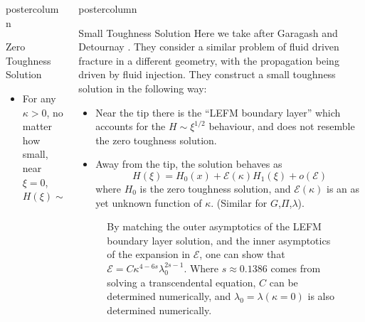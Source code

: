 \documentclass{beamer}
\newcommand{\cE}{\mathcal{E}}                               %
\newlength{\columnheight}
\begin{document}
\begin{frame}
\begin{columns}
\begin{column}{.43\textwidth}
\begin{beamercolorbox}[center]{postercolumn}
\begin{minipage}{.98\textwidth}
{\begin{myblock}{Zero Toughness Solution}
\begin{itemize}
\item For any $\kappa > 0$, no matter how small, near 
      $\xi=0$, $H(\xi)\sim \xi^{1/2}$
\end{itemize}
\end{myblock}\vfill
}\end{minipage}\end{beamercolorbox}
\end{column}
\begin{column}{.57\textwidth}
\begin{beamercolorbox}[center]{postercolumn}
\begin{minipage}{.98\textwidth} %
\parbox[t][\columnheight]{\textwidth}{ %
\begin{myblock}{Small Toughness Solution}
Here we take after Garagash and Detournay \cite{GandD}. They consider
a similar problem of fluid driven fracture in a different geometry, with the
propagation being driven by fluid injection. They construct a small toughness
solution in the following way:
\begin{itemize}
\item Near the tip there is the ``LEFM boundary layer'' which accounts for the
      $H \sim \xi^{1/2}$ behaviour, and does not resemble the zero toughness 
     solution.
\item Away from the tip, the solution behaves as 
      \[H(\xi) = H_0(x) + \cE(\kappa)H_1(\xi)+o(\cE)\]
      where $H_0$ is  the zero toughness solution, and $\cE(\kappa)$ is an
      as yet unknown function of $\kappa$. (Similar for $G$,$\Pi$,$\lambda$).
\end{itemize}
\begin{figure}
\begin{minipage}{0.5\textwidth}
By matching the outer asymptotics of the LEFM boundary layer solution, and
the inner asymptotics of the expansion in $\cE$,
one can show that $\cE = C \kappa^{4-6s}\lambda_0^{2s-1}$. Where 
$s \approx 0.1386$ comes from solving a transcendental equation, 
$C$ can be determined numerically,
and $\lambda_0 = \lambda(\kappa=0)$ is also determined
numerically.


\end{minipage}
\end{figure}
\end{myblock}}
\end{minipage}
\end{beamercolorbox}
\end{column}
\end{columns}
\end{frame}
\end{document}
